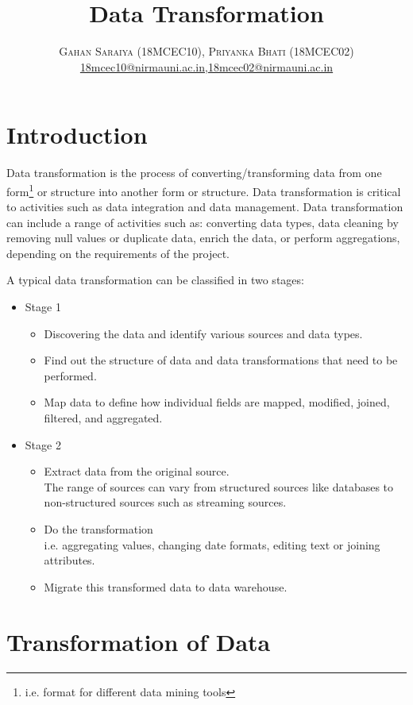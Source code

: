 \documentclass[paper=letter, fontsize=12pt]{article}
\title{\vspace{-15mm}\fontsize{24pt}{10pt}\selectfont\textbf{Data Transformation}} %
\author{
\large
{\textsc{Gahan Saraiya (18MCEC10), Priyanka Bhati (18MCEC02) }}\\[2mm]
\normalsize \href{mailto:18mcec10@nirmauni.ac.in}{18mcec10@nirmauni.ac.in},\href{mailto:18mcec02@nirmauni.ac.in}{18mcec02@nirmauni.ac.in}\\[2mm] %
}
\date{}
\begin{document}
\maketitle %
\thispagestyle{fancy} %

\section{Introduction}
Data transformation is the process of converting/transforming data from one form\footnote{i.e. format for different data mining tools} or structure into another form or structure. Data transformation is critical to activities such as data integration and data management. Data transformation can include a range of activities such as: converting data types, data cleaning by removing null values or duplicate data, enrich the data, or perform aggregations, depending on the requirements of the project.

A typical data transformation can be classified in two stages:
\begin{itemize}
	\item Stage 1
	\begin{itemize}
		\item Discovering the data and identify various sources and data types.
		\item Find out the structure of data and data transformations that need to be performed.
		\item Map data to define how individual fields are mapped, modified, joined, filtered, and aggregated.
	\end{itemize}
	\item Stage 2
	\begin{itemize}
		\item Extract data from the original source. 
		\\ The range of sources can vary from structured sources like databases to non-structured sources such as streaming sources.
		\item Do the transformation
		\\ i.e. aggregating values, changing date formats, editing text or joining attributes.
		\item Migrate this transformed data to data warehouse.			
	\end{itemize}
\end{itemize}

\section{Transformation of Data}
\end{document}

